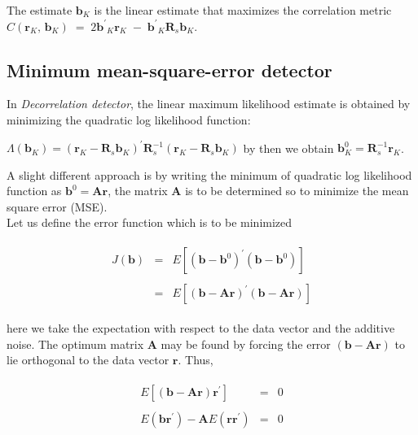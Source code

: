 The estimate $\mathrm{\mathbf{b}}_K$ is the linear estimate that maximizes the correlation metric $C(\mathrm{\mathbf{r}}_K,\,\mathrm{\mathbf{b}}_K)\;=\;2\mathrm{\mathbf{b}^{'}}_K\mathrm{\mathbf{r}}_K\;-\;\mathrm{\mathbf{b}^{'}}_K\mathrm{\mathbf{R}}_s\mathrm{\mathbf{b}}_K$.

\subsection{Minimum mean-square-error detector}
In \textit{Decorrelation detector}, the linear maximum likelihood estimate is obtained by minimizing the quadratic log likelihood function:\begin{center}$\Lambda(\mathrm{\mathbf{b}}_K)=(\mathrm{\mathbf{r}}_K-\mathrm{\mathbf{R}}_s\mathrm{\mathbf{b}}_K)^{'}\mathrm{\mathbf{R}}_s^{-1}
(\mathrm{\mathbf{r}}_K-\mathrm{\mathbf{R}}_s\mathrm{\mathbf{b}}_K)$ by then we obtain $\mathrm{\mathbf{b}}_K^{0}=\mathrm{\mathbf{R}}_s^{-1}\mathrm{\mathbf{r}}_K$.\end{center} A slight different approach is by writing the minimum of quadratic log likelihood function as $\mathrm{\mathbf{b}}^{0}=\mathrm{\mathbf{Ar}}$, the matrix \textbf{A} is to be determined so to minimize the mean square error (MSE).\\

Let us define the error function which is to be minimized

\begin{eqnarray}
\begin{array}{lll}
J(\mathrm{\mathbf{b}})&=&E\left [ (\mathrm{\mathbf{b}}-\mathrm{\mathbf{b}}^0)^{'}(\mathrm{\mathbf{b}}-\mathrm{\mathbf{b}}^0)\right ] \\ \\
&=&E\left [ (\mathrm{\mathbf{b}}-\mathrm{\mathbf{Ar}})^{'}(\mathrm{\mathbf{b}}-\mathrm{\mathbf{Ar}})\right ]
\end{array}
\end{eqnarray}

here we take the expectation with respect to the data vector and the additive noise. The optimum matrix \textbf{A} may be found by forcing the error $(\mathrm{\mathbf{b}}-\mathrm{\mathbf{Ar}})$ to lie orthogonal to the data vector $\textbf{r}$. Thus,

\begin{eqnarray}
\begin{array}{lll}
E\left[ (\mathrm{\mathbf{b}}-\mathrm{\mathbf{Ar}})\mathrm{\mathbf{r}}^{'}\right ] &=&0  \\ \\
E(\mathrm{\mathbf{br^{'}}})-\mathrm{\mathbf{A}}E(\mathrm{\mathbf{rr^{'}}}) &=&0

\end{array}
\end{eqnarray}

